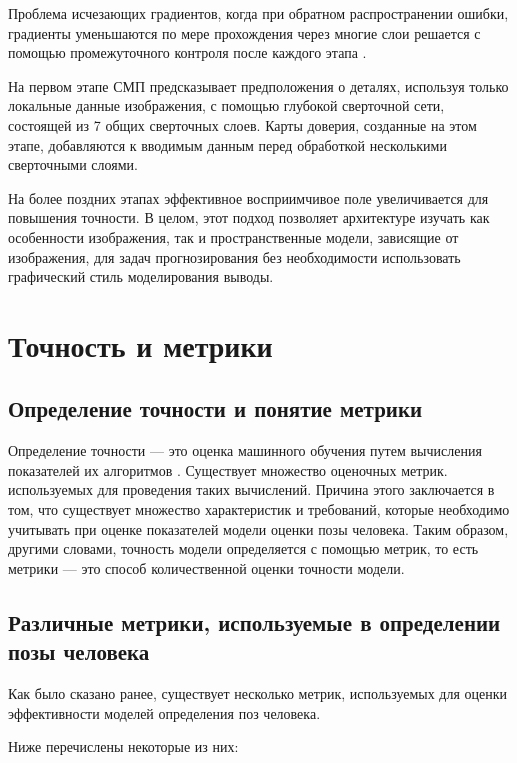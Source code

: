 Проблема исчезающих градиентов, когда при обратном распространении ошибки, градиенты уменьшаются по мере прохождения через многие слои решается с помощью промежуточного контроля после каждого этапа \cite{wei2016cpm}.

На первом этапе СМП предсказывает предположения о деталях, используя только локальные данные изображения, с помощью глубокой сверточной сети, состоящей из 7 общих сверточных слоев. Карты доверия, созданные на этом этапе, добавляются к вводимым данным перед обработкой несколькими сверточными слоями.

На более поздних этапах эффективное восприимчивое поле увеличивается для повышения точности. 
В целом, этот подход позволяет архитектуре изучать как особенности изображения, так и пространственные модели, зависящие от изображения, для задач прогнозирования без необходимости использовать графический стиль моделирования выводы.

\section{Точность и метрики}

\subsection{Определение точности и понятие метрики}

Определение точности --- это оценка машинного обучения путем вычисления показателей их алгоритмов \cite{vyugin}. 
Существует множество оценочных метрик. используемых для проведения таких вычислений.
Причина этого заключается в том, что существует множество характеристик и требований, которые необходимо учитывать при оценке показателей модели оценки позы человека.
Таким образом, другими словами, точность модели определяется с помощью метрик, то есть метрики --- это способ количественной оценки точности модели.

\subsection{Различные метрики, используемые в определении позы человека}

Как было сказано ранее, существует несколько метрик, используемых для оценки эффективности моделей определения поз человека.

Ниже перечислены некоторые из них:

